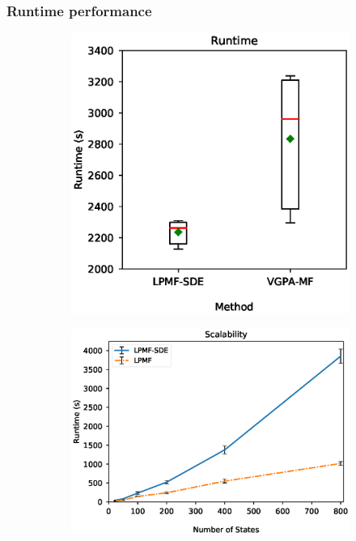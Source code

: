 \begin{frame}[t]
    \frametitle{Runtime performance}
    \begin{figure}
        \centering
        \begin{subfigure}[b]{0.42\textwidth}
            \includegraphics[width=\textwidth]{graphics/lorenz-96-runtime-boxplot}
            \label{fig-lorenz-96-runtime-boxplot}
        \end{subfigure}
        \begin{subfigure}[b]{0.56\textwidth}
        \includegraphics[width=\textwidth]{graphics/lorenz-96-scalability}
        \label{fig-lorenz-96-scalability}
        \end{subfigure}  
    \end{figure}    
\end{frame}

